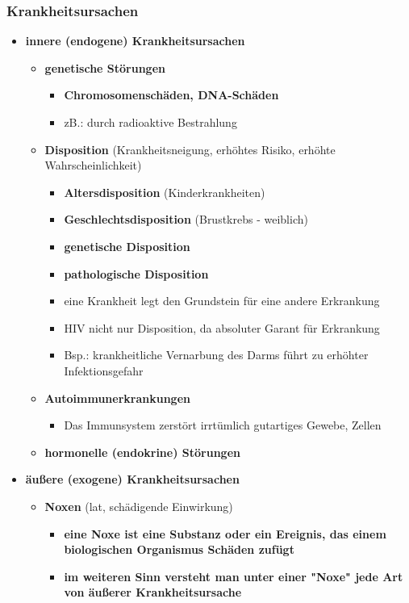 \subsubsection{Krankheitsursachen}
	\begin{itemize}
		\item \textbf{innere (endogene) Krankheitsursachen}
			\begin{itemize}
				\item \textbf{genetische Störungen}
					\begin{itemize}
						\item \textbf{Chromosomenschäden, DNA-Schäden}
						\item zB.: durch radioaktive Bestrahlung
					\end{itemize}
				\item \textbf{Disposition} (Krankheitsneigung, erhöhtes Risiko, erhöhte Wahrscheinlichkeit)
					\begin{itemize}
						\item \textbf{Altersdisposition} (Kinderkrankheiten)
						\item \textbf{Geschlechtsdisposition} (Brustkrebs - weiblich)
						\item \textbf{genetische Disposition}
						\item \textbf{pathologische Disposition}
						\item eine Krankheit legt den Grundstein für eine andere Erkrankung
						\item HIV nicht nur Disposition, da absoluter Garant für Erkrankung
						\item Bsp.: krankheitliche Vernarbung des Darms führt zu erhöhter Infektionsgefahr 
					\end{itemize}
				\item \textbf{Autoimmunerkrankungen}
					\begin{itemize}
						\item Das Immunsystem zerstört irrtümlich gutartiges Gewebe, Zellen
					\end{itemize}
				\item \textbf{hormonelle (endokrine) Störungen}
			\end{itemize}
\pagebreak
		\item \textbf{äußere (exogene) Krankheitsursachen}
			\begin{itemize}
				\item \textbf{Noxen} (lat, schädigende Einwirkung)
					\begin{itemize}
						\item \textbf{eine Noxe ist eine Substanz oder ein Ereignis, das einem biologischen Organismus Schäden zufügt}
						\item \textbf{im weiteren Sinn versteht man unter einer "Noxe" jede Art von äußerer Krankheitsursache}
					\end{itemize}
			\end{itemize}
	\end{itemize}
